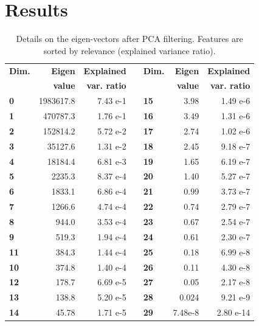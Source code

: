 \documentclass[fleqn,9 pt]{SelfArx} %
\begin{document}
\begin{sloppypar}
\section{Results}

\begin{table}
\begin{scriptsize}
\begin{center}

\begin{tabular}{ l r r c l r r }
\hline
\textbf{Dim.} & \textbf{Eigen} & \textbf{Explained} & \hspace{0.1cm} & \textbf{Dim.} & \textbf{Eigen} & \textbf{Explained} \\
    &  \textbf{value} & \textbf{var. ratio} & & & \textbf{value} & \textbf{var. ratio} \\
\hline
\textbf{0} & 1983617.8 & 7.43 e-1 & & \textbf{15} & 3.98 & 1.49 e-6\\
\textbf{1} & 470787.3 & 1.76 e-1  & & \textbf{16} & 3.49 & 1.31 e-6\\
\textbf{2} & 152814.2 & 5.72 e-2  & & \textbf{17} & 2.74 & 1.02 e-6\\
\textbf{3} & 35127.6 & 1.31 e-2   & & \textbf{18} & 2.45 & 9.18 e-7\\
\textbf{4} & 18184.4 & 6.81 e-3   & & \textbf{19} & 1.65 & 6.19 e-7\\
\textbf{5} & 2235.3 & 8.37 e-4    & & \textbf{20} & 1.40 & 5.27 e-7\\
\textbf{6} & 1833.1 & 6.86 e-4    & & \textbf{21} & 0.99 & 3.73 e-7\\
\textbf{7} & 1266.6 & 4.74 e-4    & & \textbf{22} & 0.74 & 2.79 e-7\\
\textbf{8} & 944.0 & 3.53 e-4     & & \textbf{23} & 0.67 & 2.54 e-7\\
\textbf{9} & 519.3 & 1.94 e-4     & & \textbf{24} & 0.61 & 2.30 e-7\\
\textbf{11} & 384.3 & 1.44 e-4    & & \textbf{25} & 0.18 & 6.99 e-8\\
\textbf{10} & 374.8 & 1.40 e-4    & & \textbf{26} & 0.11 & 4.30 e-8\\
\textbf{12} & 178.7 & 6.69 e-5    & & \textbf{27} & 0.05 & 2.17 e-8\\
\textbf{13} & 138.8 & 5.20 e-5    & & \textbf{28} & 0.024 & 9.21 e-9\\
\textbf{14} & 45.78 & 1.71 e-5    & & \textbf{29} & 7.48e-8 & 2.80 e-14\\
\hline
\end{tabular}
\label{table-pca}
\end{center}
\end{scriptsize}
\caption{\small Details on the eigen-vectors after PCA filtering. Features are sorted by relevance (explained variance ratio).}
\label{table-pca}
\end{table}


\end{sloppypar}
\end{document}
